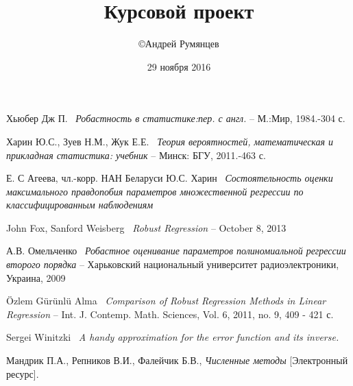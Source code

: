 \documentclass[a4paper,14pt]{extarticle}
\title{Курсовой проект}
\author{\copyright Андрей Румянцев}
\date{29 ноября 2016}
\begin{document}


\newpage 
\thispagestyle{empty}
\addtocounter{page}{-1}
\mbox{}
\newpage


\newpage

\tableofcontents
\newpage 

 
\newpage


\newpage


\newpage

\newpage
{}
\begin{thebibliography}{8}
    Хьюбер Дж П.~
    \textit{Робастность в статистике:пер. с англ.} --
    М.:Мир, 1984.-304 с.

    Харин Ю.С., Зуев Н.М.,
    Жук Е.Е.~
    \textit{Теория вероятностей, математическая и прикладная статистика: учебник} --
    Минск: БГУ, 2011.-463 с.

    

    Е. С Агеева, чл.-корр. НАН Беларуси Ю.С. Харин~
    \textit{Состоятельность оценки максимального правдопобия параметров множественной регрессии по классифицированным наблюдениям}

    John Fox, Sanford Weisberg~
    \textit{Robust Regression} --
    October 8, 2013

    А.В. Омельченко~
    \textit{Робастное оценивание параметров полиномиальной регрессии второго порядка} --
    Харьковский национальный университет радиоэлектроники, Украина, 2009

    \"{O}zlem G\"{u}r\"{u}nl\"{u} Alma~
    \textit{Comparison of Robust Regression Methods
    in Linear Regression} -- 
    Int. J. Contemp. Math. Sciences, Vol. 6, 2011, no. 9, 409 - 421 с.

    Sergei Winitzki~
    \textit{A handy approximation for the error function and its inverse.}

    Мандрик П.А., Репников В.И., Фалейчик Б.В.,
    \textit{Численные методы} [Электронный ресурс].
\end{thebibliography}
\newpage


\end{document}
